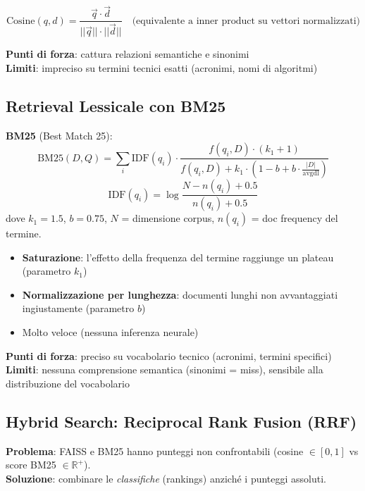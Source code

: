 \documentclass[12pt,a4paper]{article}
\begin{document}
\begin{formulabox}
\[
\text{Cosine}(q, d) = \frac{\vec{q} \cdot \vec{d}}{||\vec{q}|| \cdot ||\vec{d}||} \quad \text{(equivalente a inner product su vettori normalizzati)}
\]
\end{formulabox}

\textbf{Punti di forza}: cattura relazioni semantiche e sinonimi\\
\textbf{Limiti}: impreciso su termini tecnici esatti (acronimi, nomi di algoritmi)

\subsection{Retrieval Lessicale con BM25}

\begin{formulabox}
\textbf{BM25} (Best Match 25):
\[
\text{BM25}(D,Q) = \sum_{i} \text{IDF}(q_i) \cdot \frac{f(q_i,D) \cdot (k_1+1)}{f(q_i,D) + k_1 \cdot \left(1 - b + b \cdot \frac{|D|}{\text{avgdl}}\right)}
\]
\[
\text{IDF}(q_i) = \log\frac{N - n(q_i) + 0.5}{n(q_i) + 0.5}
\]
dove $k_1 = 1.5$, $b = 0.75$, $N$ = dimensione corpus, $n(q_i)$ = doc frequency del termine.
\end{formulabox}

\begin{itemize}
  \item \textbf{Saturazione}: l'effetto della frequenza del termine raggiunge un plateau (parametro $k_1$)
  \item \textbf{Normalizzazione per lunghezza}: documenti lunghi non avvantaggiati ingiustamente (parametro $b$)
  \item Molto veloce (nessuna inferenza neurale)
\end{itemize}

\textbf{Punti di forza}: preciso su vocabolario tecnico (acronimi, termini specifici)\\
\textbf{Limiti}: nessuna comprensione semantica (sinonimi = miss), sensibile alla distribuzione del vocabolario

\subsection{Hybrid Search: Reciprocal Rank Fusion (RRF)}

\begin{defbox}
\textbf{Problema}: FAISS e BM25 hanno punteggi non confrontabili (cosine $\in [0,1]$ vs score BM25 $\in \mathbb{R}^+$).\\
\textbf{Soluzione}: combinare le \emph{classifiche} (rankings) anzich\'e i punteggi assoluti.
\end{defbox}
\end{document}
